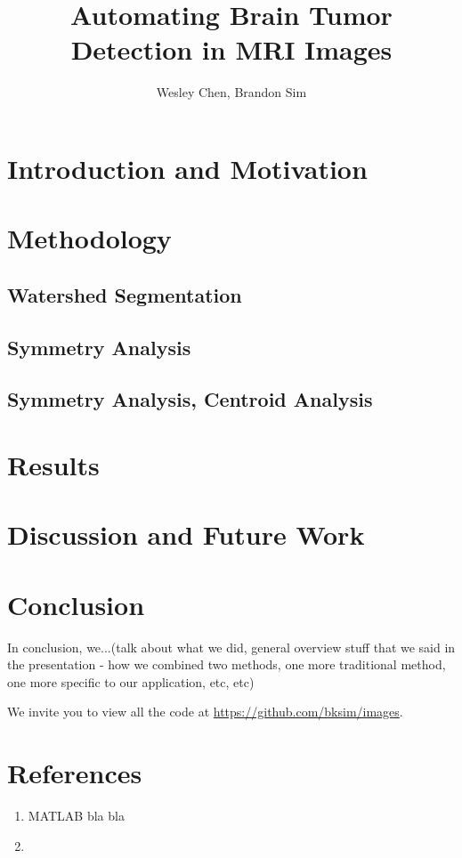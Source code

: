 \documentclass[12pt]{article}
\theoremstyle{plain}%
\theoremstyle{definition}
\theoremstyle{remark}
\begin{document}
\title{Automating Brain Tumor Detection in MRI Images}
\author{Wesley Chen, Brandon Sim}

\maketitle
\tableofcontents
\newpage

\section{Introduction and Motivation}

\section{Methodology}
\subsection{Watershed Segmentation}

\subsection{Symmetry Analysis}

\subsection{Symmetry Analysis, Centroid Analysis}

\section{Results}

\section{Discussion and Future Work}


\section{Conclusion}
In conclusion, we...(talk about what we did, general overview stuff that we said in the presentation - how we combined two methods, one more traditional method, one more specific to our application, etc, etc)

We invite you to view all the code at \url{https://github.com/bksim/images}.
\section{References}
\begin{enumerate}
\item MATLAB bla bla
\item
\end{enumerate}
\end{document}
